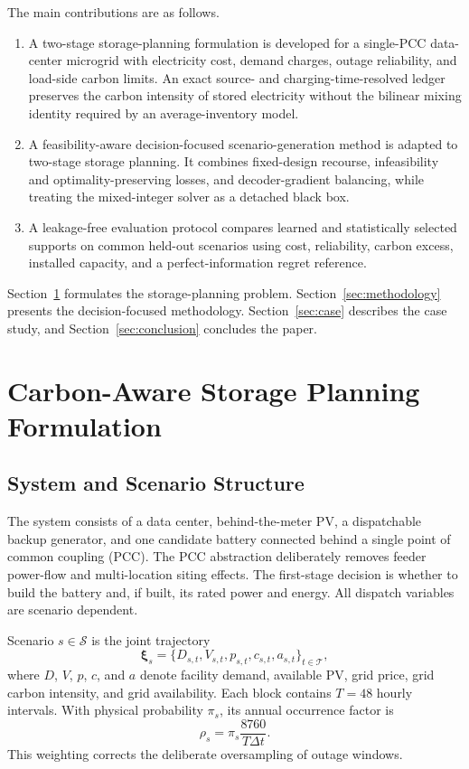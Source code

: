 \documentclass[times]{elsarticle}
\begin{document}
The main contributions are as follows.
\begin{enumerate}[leftmargin=*,label=\arabic*)]
\item A two-stage storage-planning formulation is developed for a single-PCC
data-center microgrid with electricity cost, demand charges, outage reliability,
and load-side carbon limits. An exact source- and charging-time-resolved ledger
preserves the carbon intensity of stored electricity without the bilinear mixing
identity required by an average-inventory model.
\item A feasibility-aware decision-focused scenario-generation method is
adapted to two-stage storage planning. It combines fixed-design recourse,
infeasibility and optimality-preserving losses, and decoder-gradient balancing,
while treating the mixed-integer solver as a detached black box.
\item A leakage-free evaluation protocol compares learned and statistically
selected supports on common held-out scenarios using cost, reliability, carbon
excess, installed capacity, and a perfect-information regret reference.
\end{enumerate}

Section~\ref{sec:formulation} formulates the storage-planning problem.
Section~\ref{sec:methodology} presents the decision-focused methodology.
Section~\ref{sec:case} describes the case study, and
Section~\ref{sec:conclusion} concludes the paper.

\section{Carbon-Aware Storage Planning Formulation}
\label{sec:formulation}

\subsection{System and Scenario Structure}

The system consists of a data center, behind-the-meter PV, a dispatchable
backup generator, and one candidate battery connected behind a single point of
common coupling (PCC). The PCC abstraction deliberately removes feeder
power-flow and multi-location siting effects. The first-stage decision is
whether to build the battery and, if built, its rated power and energy. All
dispatch variables are scenario dependent.

Scenario $s\in\mathcal S$ is the joint trajectory
\begin{equation}
\bm\xi_s=\{D_{s,t},V_{s,t},p_{s,t},c_{s,t},a_{s,t}\}_{t\in\mathcal T},
\label{eq:scenario}
\end{equation}
where $D$, $V$, $p$, $c$, and $a$ denote facility demand, available PV,
grid price, grid carbon intensity, and grid availability. Each block contains
$T=48$ hourly intervals. With physical probability $\pi_s$, its annual
occurrence factor is
\begin{equation}
\rho_s=\pi_s\frac{8760}{T\Delta t}.
\label{eq:annualization}
\end{equation}
This weighting corrects the deliberate oversampling of outage windows.
\end{document}
